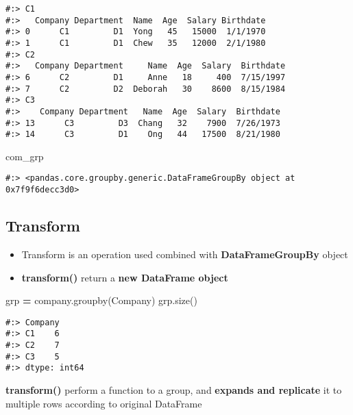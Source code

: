 \documentclass[
]{book}
\newenvironment{Shaded}{\begin{snugshade}}{\end{snugshade}}
\newcommand{\NormalTok}[1]{#1}
\newcommand{\OperatorTok}[1]{\textcolor[rgb]{0.43,0.43,0.43}{\textbf{#1}}}
\newcommand{\StringTok}[1]{\textcolor[rgb]{0.5,0.5,0.5}{#1}}
\providecommand{\tightlist}{%
  \setlength{\itemsep}{0pt}\setlength{\parskip}{0pt}}
\begin{document}
\begin{verbatim}
#:> C1
#:>   Company Department  Name  Age  Salary Birthdate
#:> 0      C1         D1  Yong   45   15000  1/1/1970
#:> 1      C1         D1  Chew   35   12000  2/1/1980
#:> C2
#:>   Company Department     Name  Age  Salary  Birthdate
#:> 6      C2         D1     Anne   18     400  7/15/1997
#:> 7      C2         D2  Deborah   30    8600  8/15/1984
#:> C3
#:>    Company Department   Name  Age  Salary  Birthdate
#:> 13      C3         D3  Chang   32    7900  7/26/1973
#:> 14      C3         D1    Ong   44   17500  8/21/1980
\end{verbatim}

\begin{Shaded}
\begin{Highlighting}[]
\NormalTok{com\_grp}
\end{Highlighting}
\end{Shaded}

\begin{verbatim}
#:> <pandas.core.groupby.generic.DataFrameGroupBy object at 0x7f9f6decc3d0>
\end{verbatim}

\hypertarget{transform}{%
\subsection{Transform}\label{transform}}

\begin{itemize}
\tightlist
\item
  Transform is an operation used combined with \textbf{DataFrameGroupBy} object\\
\item
  \textbf{transform()} return a \textbf{new DataFrame object}
\end{itemize}

\begin{Shaded}
\begin{Highlighting}[]
\NormalTok{grp }\OperatorTok{=}\NormalTok{ company.groupby(}\StringTok{\textquotesingle{}Company\textquotesingle{}}\NormalTok{)}
\NormalTok{grp.size()}
\end{Highlighting}
\end{Shaded}

\begin{verbatim}
#:> Company
#:> C1    6
#:> C2    7
#:> C3    5
#:> dtype: int64
\end{verbatim}

\textbf{transform()} perform a function to a group, and \textbf{expands and replicate} it to multiple rows according to original DataFrame
\end{document}

